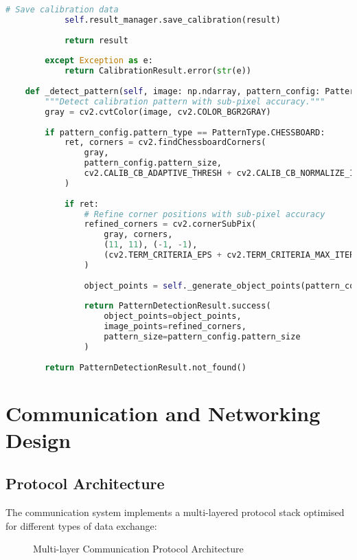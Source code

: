 \documentclass[11pt,a4paper]{report}
\begin{document}
\begin{lstlisting}[language=Python]
            # Save calibration data
            self.result_manager.save_calibration(result)
            
            return result
            
        except Exception as e:
            return CalibrationResult.error(str(e))
    
    def _detect_pattern(self, image: np.ndarray, pattern_config: PatternConfig) -> PatternDetectionResult:
        """Detect calibration pattern with sub-pixel accuracy."""
        gray = cv2.cvtColor(image, cv2.COLOR_BGR2GRAY)
        
        if pattern_config.pattern_type == PatternType.CHESSBOARD:
            ret, corners = cv2.findChessboardCorners(
                gray, 
                pattern_config.pattern_size,
                cv2.CALIB_CB_ADAPTIVE_THRESH + cv2.CALIB_CB_NORMALIZE_IMAGE
            )
            
            if ret:
                # Refine corner positions with sub-pixel accuracy
                refined_corners = cv2.cornerSubPix(
                    gray, corners,
                    (11, 11), (-1, -1),
                    (cv2.TERM_CRITERIA_EPS + cv2.TERM_CRITERIA_MAX_ITER, 30, 0.001)
                )
                
                object_points = self._generate_object_points(pattern_config)
                
                return PatternDetectionResult.success(
                    object_points=object_points,
                    image_points=refined_corners,
                    pattern_size=pattern_config.pattern_size
                )
        
        return PatternDetectionResult.not_found()
\end{lstlisting}

\section{Communication and Networking Design}

\subsection{Protocol Architecture}

The communication system implements a multi-layered protocol stack optimised for different types of data exchange:

\begin{figure}[ht]
\centering
\framebox[0.9\textwidth][c]{\rule{0pt}{4cm}}
\caption{Multi-layer Communication Protocol Architecture}
\label{fig:protocol-arch}
\end{figure}
\end{document}
